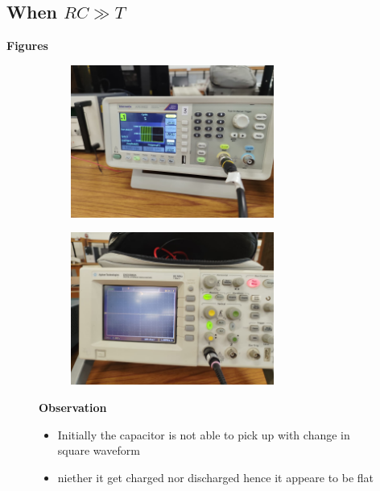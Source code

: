 \documentclass[a4paper,12pt]{article}
\begin{document}
\subsection{When $RC\gg T$}
\begin{itemize}
    \item \textbf{Figures}
    \begin{figure}[H]
    \centering
    \begin{subfigure}{0.48\textwidth}
        \centering
        \includegraphics[height=5cm]{figs/transinputrc>>t.jpeg}
    \end{subfigure}
    \hspace{0.04\textwidth} %
    \begin{subfigure}{0.48\textwidth}
        \centering
        \includegraphics[height=5cm]{figs/transoutputrc>>t.jpeg}
    \end{subfigure}
    \item \textbf{Observation}
    \begin{itemize}
        \item Initially the capacitor is not able to pick up with change in square waveform  
        \item niether it get charged nor discharged hence it appeare to be flat
    \end{itemize}
\end{figure}
\end{itemize}
\newpage
{}
\end{document}
